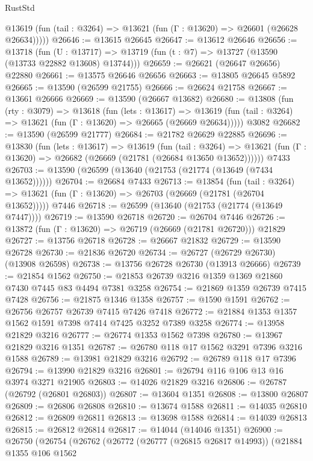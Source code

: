 \begin{lexlean}{RustStd}
\begin{coremodule}
      @13619 (fun (tail : @3264) => @13621 (fun (Γ : @13620) => @26601 (@26628 @26634)))))
@26646 := @13615 @26645
@26647 := @13612 @26646
@26656 := @13718
    (fun (U : @13717) => @13719 (fun (t : @7) => @13727 (@13590 (@13733 @22882 @13608) @13744)))
@26659 := @26621 (@26647 @26656) @22880
@26661 := @13575 @26646 @26656
@26663 := @13805 @26645 @5892
@26665 := @13590 (@26599 @21755)
@26666 := @26624 @21758
@26667 := @13661 @26666
@26669 := @13590 (@26667 @13682)
@26680 := @13808
    (fun (rty : @3079) =>
    @13618
      (fun (lets : @13617) =>
      @13619 (fun (tail : @3264) => @13621 (fun (Γ : @13620) => @26665 (@26669 @26634)))))
    @3082
@26682 := @13590 (@26599 @21777)
@26684 := @21782 @26629 @22885
@26696 := @13830
    (fun (lets : @13617) =>
    @13619
      (fun (tail : @3264) =>
      @13621 (fun (Γ : @13620) => @26682 (@26669 (@21781 (@26684 @13650 @13652))))))
    @7433
@26703 := @13590 (@26599 (@13640 (@21753 (@21774 (@13649 (@7434 @13652))))))
@26704 := @26684 @7433
@26713 := @13854
    (fun (tail : @3264) => @13621 (fun (Γ : @13620) => @26703 (@26669 (@21781 (@26704 @13652)))))
    @7446
@26718 := @26599 (@13640 (@21753 (@21774 (@13649 @7447))))
@26719 := @13590 @26718
@26720 := @26704 @7446
@26726 := @13872 (fun (Γ : @13620) => @26719 (@26669 (@21781 @26720))) @21829
@26727 := @13756 @26718
@26728 := @26667 @21832
@26729 := @13590 @26728
@26730 := @21836 @26720
@26734 := @26727 (@26729 @26730) (@13908 @26598)
@26738 := @13756 @26728 @26730 (@13913 @26666)
@26739 := @21854 @1562
@26750 := @21853 @26739 @3216 @1359 @1369 @21860 @7430 @7445 @83 @4494 @7381 @3258
@26754 := @21869 @1359 @26739 @7415 @7428
@26756 := @21875 @1346 @1358
@26757 := @1590 @1591
@26762 := @26756 @26757 @26739 @7415 @7426 @7418
@26772 := @21884 @1353 @1357 @1562 @1591 @7398 @7414 @7425 @3252 @7389 @3258
@26774 := @13958 @21829 @3216
@26777 := @26774 @1353 @1562 @7398
@26780 := @13967 @21829 @3216 @1351
@26787 := @26780 @118 @17 @1562 @3291 @7396 @3216 @1588
@26789 := @13981 @21829 @3216
@26792 := @26789 @118 @17 @7396
@26794 := @13990 @21829 @3216
@26801 := @26794 @116 @106 @13 @16 @3974 @3271 @21905
@26803 := @14026 @21829 @3216
@26806 := @26787 (@26792 (@26801 @26803))
@26807 := @13604 @1351
@26808 := @13800 @26807
@26809 := @26806 @26808
@26810 := @13674 @1588
@26811 := @14035 @26810
@26812 := @26809 @26811
@26813 := @13698 @1588
@26814 := @14039 @26813
@26815 := @26812 @26814
@26817 := @14044 (@14046 @1351)
@26900 := @26750
    (@26754
      (@26762
        (@26772
          (@26777 (@26815 @26817 @14993))
          (@21884
            @1355
            @106
            @1562

\end{coremodule}
\end{lexlean}
